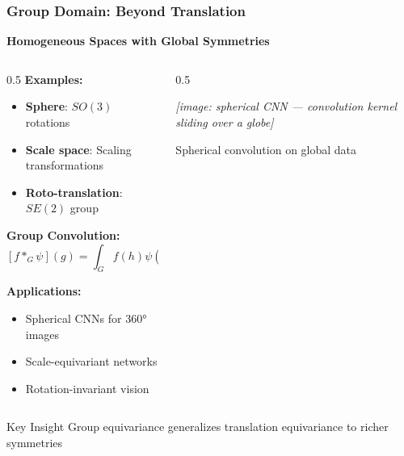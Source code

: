 \begin{frame}[fragile]\frametitle{Group Domain: Beyond Translation}

\begin{center}
\textbf{Homogeneous Spaces with Global Symmetries}
\end{center}

\begin{columns}
\begin{column}{0.5\textwidth}
\textbf{Examples:}
\begin{itemize}
\item \textbf{Sphere}: $SO(3)$ rotations
\item \textbf{Scale space}: Scaling transformations  
\item \textbf{Roto-translation}: $SE(2)$ group
\end{itemize}

\textbf{Group Convolution:}
$$[f *_G \psi](g) = \int_G f(h) \psi(g^{-1}h) dh$$

\textbf{Applications:}
\begin{itemize}
\item Spherical CNNs for 360° images
\item Scale-equivariant networks
\item Rotation-invariant vision
\end{itemize}
\end{column}
\begin{column}{0.5\textwidth}
\begin{center}
\textit{[image: spherical CNN — convolution kernel sliding over a globe]}

\vspace{0.5cm}
{\small Spherical convolution on global data}
\end{center}
\end{column}
\end{columns}

\begin{block}{Key Insight}
Group equivariance generalizes translation equivariance to richer symmetries
\end{block}

\end{frame}

